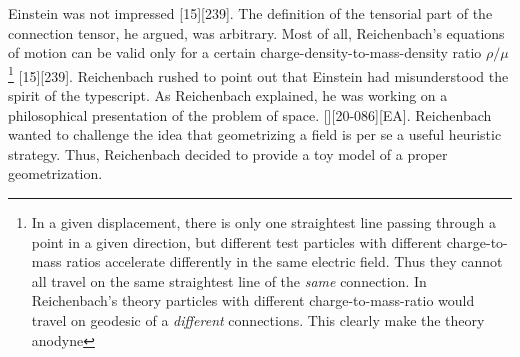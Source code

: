 \documentclass[draft]{article}
\begin{document}
Einstein was not impressed [15][239]. The definition of the tensorial part of the connection tensor, he argued, was arbitrary. Most of all, Reichenbach's equations of motion can be valid only for a certain charge-density-to-mass-density ratio $\rho/\mu$\footnote{In a given displacement, there is only one straightest line passing through a point in a given direction, but different test particles with different charge-to-mass ratios accelerate differently in the same electric field. Thus they cannot all travel on the same straightest line of the \emph{same} connection. In Reichenbach's theory particles with different charge-to-mass-ratio would travel on geodesic of a \emph{different} connections. This clearly make the theory anodyne} [15][239]. Reichenbach rushed to point out that Einstein had misunderstood the spirit of the typescript. As Reichenbach explained, he was working on a philosophical presentation of the problem of space. [][20-086][EA]. Reichenbach wanted to challenge the idea that geometrizing a field is per se a useful heuristic strategy. Thus, Reichenbach decided to provide a toy model of a proper geometrization. 



\end{document}
